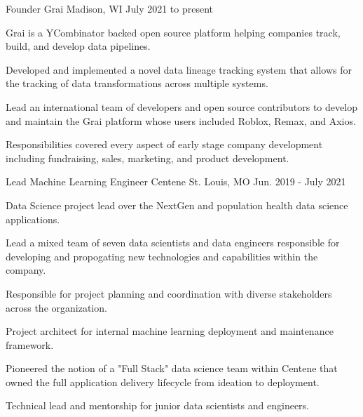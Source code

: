 

\begin{cventries}
  \cventry
    {Founder} %
    {Grai} %
    {Madison, WI} %
    {July 2021 to present} %
    {
      \begin{cvitems} %
        \item {Grai is a YCombinator backed open source platform helping companies track, build, and develop data pipelines.}
        \item {Developed and implemented a novel data lineage tracking system that allows for the tracking of data transformations across multiple systems.}
        \item {Lead an international team of developers and open source contributors to develop and maintain the Grai platform whose users included Roblox, Remax, and Axios.}
        \item {Responsibilities covered every aspect of early stage company development including fundraising, sales, marketing, and product development.}
      \end{cvitems}
    }

  \cventry
    {Lead Machine Learning Engineer} %
    {Centene} %
    {St. Louis, MO} %
    {Jun. 2019 - July 2021} %
    {
      \begin{cvitems} %
        \item {Data Science project lead over the NextGen and population health data science applications.}
        \item {Lead a mixed team of seven data scientists and data engineers responsible for developing and propogating new technologies and capabilities within the company.}
        \item {Responsible for project planning and coordination with diverse stakeholders across the organization.}
        \item {Project architect for internal machine learning deployment and maintenance framework.}
        \item {Pioneered the notion of a "Full Stack" data science team within Centene that owned the full application delivery lifecycle from ideation to deployment.}
        \item {Technical lead and mentorship for junior data scientists and engineers.}
      \end{cvitems}
    }


\end{cventries}
